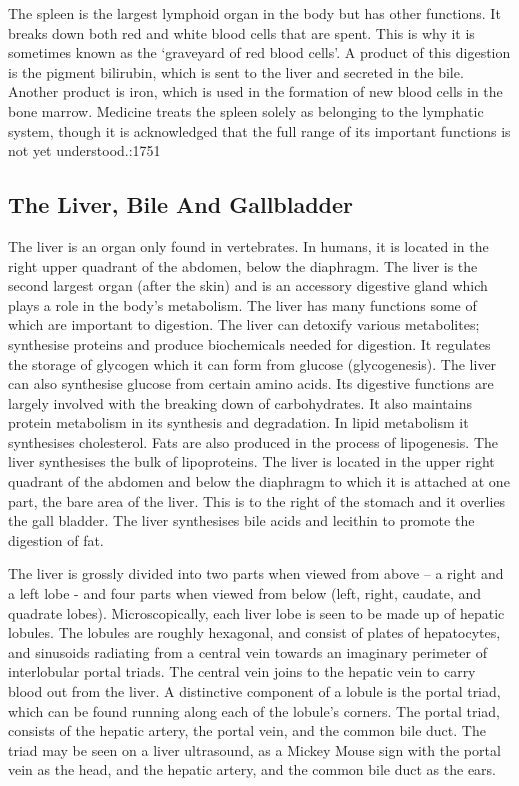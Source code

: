 The spleen is the largest lymphoid organ in the body but has other functions. It breaks down both red and white blood cells that are spent. This is why it is sometimes known as the `graveyard of red blood cells'. A product of this digestion is the pigment bilirubin, which is sent to the liver and secreted in the bile. Another product is iron, which is used in the formation of new blood cells in the bone marrow. Medicine treats the spleen solely as belonging to the lymphatic system, though it is acknowledged that the full range of its important functions is not yet understood.:1751

\hypertarget{the-liver-bile-and-gallbladder}{%
\subsection{The Liver, Bile And Gallbladder}\label{the-liver-bile-and-gallbladder}}

The liver is an organ only found in vertebrates. In humans, it is located in the right upper quadrant of the abdomen, below the diaphragm. The liver is the second largest organ (after the skin) and is an accessory digestive gland which plays a role in the body's metabolism. The liver has many functions some of which are important to digestion. The liver can detoxify various metabolites; synthesise proteins and produce biochemicals needed for digestion. It regulates the storage of glycogen which it can form from glucose (glycogenesis). The liver can also synthesise glucose from certain amino acids. Its digestive functions are largely involved with the breaking down of carbohydrates. It also maintains protein metabolism in its synthesis and degradation. In lipid metabolism it synthesises cholesterol. Fats are also produced in the process of lipogenesis. The liver synthesises the bulk of lipoproteins. The liver is located in the upper right quadrant of the abdomen and below the diaphragm to which it is attached at one part, the bare area of the liver. This is to the right of the stomach and it overlies the gall bladder. The liver synthesises bile acids and lecithin to promote the digestion of fat.

The liver is grossly divided into two parts when viewed from above -- a right and a left lobe - and four parts when viewed from below (left, right, caudate, and quadrate lobes). Microscopically, each liver lobe is seen to be made up of hepatic lobules. The lobules are roughly hexagonal, and consist of plates of hepatocytes, and sinusoids radiating from a central vein towards an imaginary perimeter of interlobular portal triads. The central vein joins to the hepatic vein to carry blood out from the liver. A distinctive component of a lobule is the portal triad, which can be found running along each of the lobule's corners. The portal triad, consists of the hepatic artery, the portal vein, and the common bile duct. The triad may be seen on a liver ultrasound, as a Mickey Mouse sign with the portal vein as the head, and the hepatic artery, and the common bile duct as the ears.



